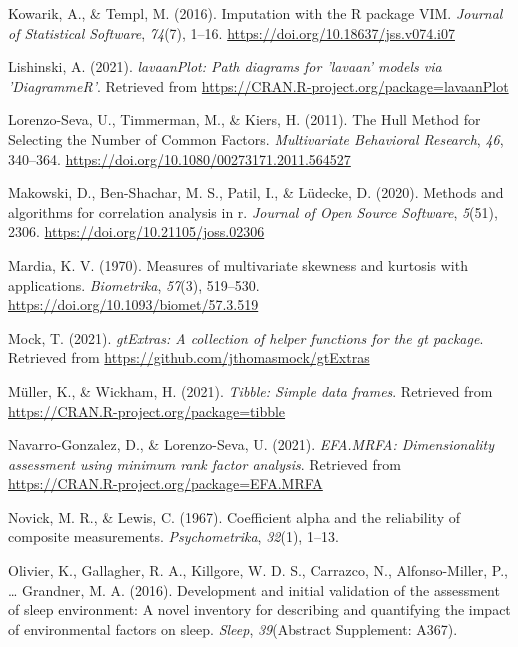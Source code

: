 \documentclass[
  english,
  man]{apa6}
\newlength{\cslhangindent}
\newlength{\cslentryspacingunit} %
\newenvironment{CSLReferences}[2] %
 {%
  \setlength{\parindent}{0pt}
  \ifodd #1
  \let\oldpar\par
  \def\par{\hangindent=\cslhangindent\oldpar}
  \fi
  \setlength{\parskip}{#2\cslentryspacingunit}
 }%
 {}
\begin{document}
\begin{CSLReferences}{1}{0}
\leavevmode{}%
Kowarik, A., \& Templ, M. (2016). Imputation with the {R} package {VIM}. \emph{Journal of Statistical Software}, \emph{74}(7), 1--16. \url{https://doi.org/10.18637/jss.v074.i07}

\leavevmode{}%
Lishinski, A. (2021). \emph{lavaanPlot: Path diagrams for 'lavaan' models via 'DiagrammeR'}. Retrieved from \url{https://CRAN.R-project.org/package=lavaanPlot}

\leavevmode{}%
Lorenzo-Seva, U., Timmerman, M., \& Kiers, H. (2011). The {Hull Method} for {Selecting} the {Number} of {Common Factors}. \emph{Multivariate Behavioral Research}, \emph{46}, 340--364. \url{https://doi.org/10.1080/00273171.2011.564527}

\leavevmode{}%
Makowski, D., Ben-Shachar, M. S., Patil, I., \& Lüdecke, D. (2020). Methods and algorithms for correlation analysis in r. \emph{Journal of Open Source Software}, \emph{5}(51), 2306. \url{https://doi.org/10.21105/joss.02306}

\leavevmode{}%
Mardia, K. V. (1970). Measures of multivariate skewness and kurtosis with applications. \emph{Biometrika}, \emph{57}(3), 519--530. \url{https://doi.org/10.1093/biomet/57.3.519}

\leavevmode{}%
Mock, T. (2021). \emph{gtExtras: A collection of helper functions for the gt package}. Retrieved from \url{https://github.com/jthomasmock/gtExtras}

\leavevmode{}%
Müller, K., \& Wickham, H. (2021). \emph{Tibble: Simple data frames}. Retrieved from \url{https://CRAN.R-project.org/package=tibble}

\leavevmode{}%
Navarro-Gonzalez, D., \& Lorenzo-Seva, U. (2021). \emph{EFA.MRFA: Dimensionality assessment using minimum rank factor analysis}. Retrieved from \url{https://CRAN.R-project.org/package=EFA.MRFA}

\leavevmode{}%
Novick, M. R., \& Lewis, C. (1967). Coefficient alpha and the reliability of composite measurements. \emph{Psychometrika}, \emph{32}(1), 1--13.

\leavevmode{}%
Olivier, K., Gallagher, R. A., Killgore, W. D. S., Carrazco, N., Alfonso-Miller, P., \ldots{} Grandner, M. A. (2016). Development and initial validation of the assessment of sleep environment: A novel inventory for describing and quantifying the impact of environmental factors on sleep. \emph{Sleep}, \emph{39}(Abstract Supplement: A367).


\end{CSLReferences}
\end{document}
